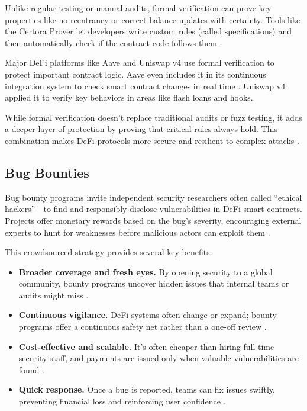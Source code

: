 \documentclass[conference]{IEEEtran}
\begin{document}
Unlike regular testing or manual audits, formal verification can prove key properties like no reentrancy or correct balance updates with certainty. Tools like the Certora Prover let developers write custom rules (called specifications) and then automatically check if the contract code follows them \cite{certora2024docs, szalachowski2021defioracles}.

Major DeFi platforms like Aave and Uniswap v4 use formal verification to protect important contract logic. Aave even includes it in its continuous integration system to check smart contract changes in real time \cite{certora2023blog}. Uniswap v4 applied it to verify key behaviors in areas like flash loans and hooks.

While formal verification doesn’t replace traditional audits or fuzz testing, it adds a deeper layer of protection by proving that critical rules always hold. This combination makes DeFi protocols more secure and resilient to complex attacks \cite{trailofbits2022ecosystem, openzeppelin2023audits}.

\subsection{Bug Bounties}

\sloppy Bug bounty programs invite independent security researchers often called “ethical hackers”—to find and responsibly disclose vulnerabilities in DeFi smart contracts. Projects offer monetary rewards based on the bug’s severity, encouraging external experts to hunt for weaknesses before malicious actors can exploit them \cite{cointracker_bugbounty}.


This crowdsourced strategy provides several key benefits:

\begin{itemize}
    \item \textbf{Broader coverage and fresh eyes.} By opening security to a global community, bounty programs uncover hidden issues that internal teams or audits might miss \cite{marcavage2023predicting, streamflow_defi_security}.
    \item \textbf{Continuous vigilance.} DeFi systems often change or expand; bounty programs offer a continuous safety net rather than a one-off review \cite{securrtech_loop}.
    \item \textbf{Cost-effective and scalable.} It’s often cheaper than hiring full-time security staff, and payments are issued only when valuable vulnerabilities are found \cite{consensys_bugbounty}.
    \item \textbf{Quick response.} Once a bug is reported, teams can fix issues swiftly, preventing financial loss and reinforcing user confidence \cite{coinmetro_crypto_bounties, streamflow_defi_security}.
\end{itemize}
\end{document}
